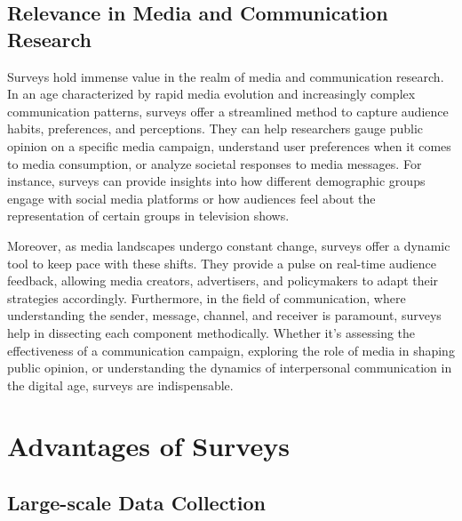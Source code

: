 \documentclass[
  b5paper]{book}
\begin{document}
\hypertarget{relevance-in-media-and-communication-research}{%
\subsection*{Relevance in Media and Communication Research}\label{relevance-in-media-and-communication-research}}

Surveys hold immense value in the realm of media and communication research. In an age characterized by rapid media evolution and increasingly complex communication patterns, surveys offer a streamlined method to capture audience habits, preferences, and perceptions. They can help researchers gauge public opinion on a specific media campaign, understand user preferences when it comes to media consumption, or analyze societal responses to media messages. For instance, surveys can provide insights into how different demographic groups engage with social media platforms or how audiences feel about the representation of certain groups in television shows.

Moreover, as media landscapes undergo constant change, surveys offer a dynamic tool to keep pace with these shifts. They provide a pulse on real-time audience feedback, allowing media creators, advertisers, and policymakers to adapt their strategies accordingly. Furthermore, in the field of communication, where understanding the sender, message, channel, and receiver is paramount, surveys help in dissecting each component methodically. Whether it's assessing the effectiveness of a communication campaign, exploring the role of media in shaping public opinion, or understanding the dynamics of interpersonal communication in the digital age, surveys are indispensable.

\hypertarget{advantages-of-surveys}{%
\section{Advantages of Surveys}\label{advantages-of-surveys}}

\hypertarget{large-scale-data-collection}{%
\subsection*{Large-scale Data Collection}\label{large-scale-data-collection}}
\end{document}
